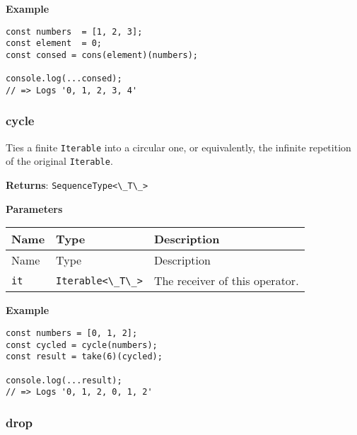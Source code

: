 \textbf{Example}

\begin{lstlisting}[label=875d77cc-924c-4f79-b69a-316c95a944d4]
const numbers  = [1, 2, 3];
const element  = 0;
const consed = cons(element)(numbers);
                                      
console.log(...consed);
// => Logs '0, 1, 2, 3, 4'
\end{lstlisting}

\hypertarget{9e681fc2-fb6e-4844-853e-d8238b44a848}{%
\subsubsection{cycle}\label{9e681fc2-fb6e-4844-853e-d8238b44a848}}

Ties a finite \passthrough{\lstinline!Iterable!} into a circular one, or
equivalently, the infinite repetition of the original
\passthrough{\lstinline!Iterable!}.

\textbf{Returns}: \passthrough{\lstinline!SequenceType<\_T\_>!}

\textbf{Parameters}

\begin{longtable}[]{
  >{\raggedright\arraybackslash}p{}
  >{\raggedright\arraybackslash}p{}
  >{\raggedright\arraybackslash}p{}@{}}

\toprule\noalign{}
Name & Type & Description \\
\midrule\noalign{}
\endfirsthead
\toprule\noalign{}
Name & Type & Description \\
\midrule\noalign{}
\endhead
\bottomrule\noalign{}
\endlastfoot
\passthrough{\lstinline!it!} & \passthrough{\lstinline!Iterable<\_T\_>!}
& The receiver of this operator. \\
\end{longtable}

\textbf{Example}

\begin{lstlisting}[label=95f0febe-03e7-4da3-91b7-135c75ca4b96]
const numbers = [0, 1, 2];
const cycled = cycle(numbers);
const result = take(6)(cycled);
                               
console.log(...result);
// => Logs '0, 1, 2, 0, 1, 2'
\end{lstlisting}

\hypertarget{35daaeb3-b3ac-47ea-818b-89d3786249a2}{%
\subsubsection{drop}\label{35daaeb3-b3ac-47ea-818b-89d3786249a2}}

